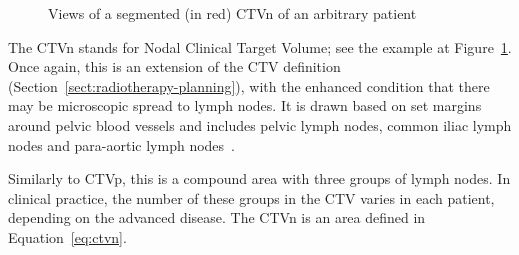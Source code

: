\documentclass[12pt,twoside]{report}
\begin{document}
\begin{figure}[H]
  \centering
  \caption{Views of a segmented (in red) CTVn of an arbitrary patient}
 \label{fig:example-CTVn}
\end{figure}

The CTVn stands for Nodal Clinical Target Volume; see the example at Figure~\ref{fig:example-CTVn}. Once again, this is an extension of the CTV definition (Section~\ref{sect:radiotherapy-planning}), with the enhanced condition that there may be microscopic spread to lymph nodes. It is drawn based on set margins around pelvic blood vessels and includes pelvic lymph nodes, common iliac lymph nodes and para-aortic lymph nodes~\cite{AMLART-data}.

Similarly to CTVp, this is a compound area with three groups of lymph nodes. In clinical practice, the number of these groups in the CTV varies in each patient, depending on the advanced disease. The CTVn is an area defined in Equation~\ref{eq:ctvn}. %
\end{document}
